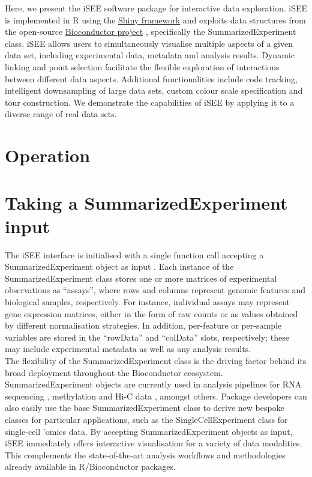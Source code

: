 \documentclass[10pt,a4paper,twocolumn]{article}
\begin{document}
Here, we present the iSEE software package for interactive data exploration.
iSEE is implemented in R using the \href{https://shiny.rstudio.com/}{Shiny framework}  \citep{chang2017shiny} and exploits data structures from the open-source \href{https://www.bioconductor.org/}{Bioconductor project}  \citep{gentleman2004bioconductor}, specifically the SummarizedExperiment class.
iSEE allows users to simultaneously visualise multiple aspects of a given data set, including experimental data, metadata and analysis results.
Dynamic linking and point selection facilitate the flexible exploration of interactions between different data aspects.
Additional functionalities include code tracking, intelligent downsampling of large data sets, custom colour scale specification and tour construction.
We demonstrate the capabilities of iSEE by applying it to a diverse range of real data sets.

\section*{Operation}
% 
% 

\section*{Taking a SummarizedExperiment input}
The iSEE interface is initialised with a single function call accepting a SummarizedExperiment object as input \citep{huber2015orchestrating}.
Each instance of the SummarizedExperiment class stores one or more matrices of experimental observations as ``assays'', where rows and columns represent genomic features and biological samples, respectively.
For instance, individual assays may represent gene expression matrices, either in the form of raw counts or as values obtained by different normalisation strategies.
In addition, per-feature or per-sample variables are stored in the ``rowData'' and ``colData'' slots, respectively; these may include experimental metadata as well as any analysis results.\\

The flexibility of the SummarizedExperiment class is the driving factor behind its broad deployment throughout the Bioconductor ecosystem.
SummarizedExperiment objects are currently used in analysis pipelines for RNA sequencing \citep{love2014moderated}, methylation \citep{aryee2014minfi} and Hi-C data \citep{lun2016infrastructure}, amongst others.
Package developers can also easily use the base SummarizedExperiment class to derive new bespoke classes for particular applications, such as the SingleCellExperiment class for single-cell 'omics data.
By accepting SummarizedExperiment objects as input, iSEE immediately offers interactive visualisation for a variety of data modalities.
This complements the state-of-the-art analysis workflows and methodologies already available in R/Bioconductor packages. \\
\end{document}
